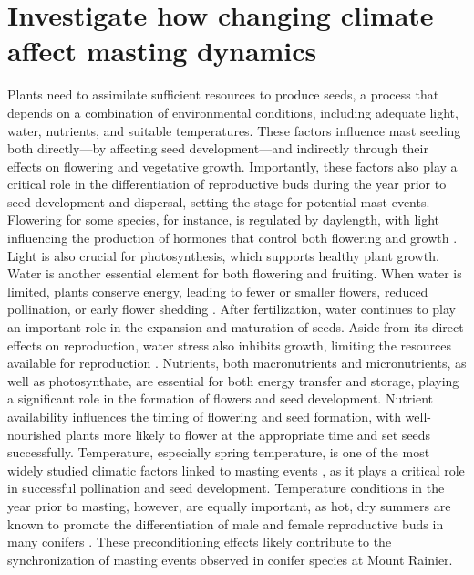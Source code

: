 \documentclass[11pt,letter]{article}
\begin{document}
\section{Investigate how changing climate affect masting dynamics}
Plants need to assimilate sufficient resources to produce seeds, a process that depends on a combination of environmental conditions, including adequate light, water, nutrients, and suitable temperatures. These factors influence mast seeding both directly—by affecting seed development—and indirectly through their effects on flowering and vegetative growth. Importantly, these factors also play a critical role in the differentiation of reproductive buds during the year prior to seed development and dispersal, setting the stage for potential mast events. Flowering for some species, for instance, is regulated by daylength, with light influencing the production of hormones that control both flowering and growth \citep{lau2010plant}. Light is also crucial for photosynthesis, which supports healthy plant growth. Water is another essential element for both flowering and fruiting. When water is limited, plants conserve energy, leading to fewer or smaller flowers, reduced pollination, or early flower shedding \citep{gallagher2017shifts}. After fertilization, water continues to play an important role in the expansion and maturation of seeds. Aside from its direct effects on reproduction, water stress also inhibits growth, limiting the resources available for reproduction \citep{hsiao1973plant, anjum2011morphological}. Nutrients, both macronutrients and micronutrients, as well as photosynthate, are essential for both energy transfer and storage, playing a significant role in the formation of flowers and seed development. Nutrient availability influences the timing of flowering and seed formation, with well-nourished plants more likely to flower at the appropriate time and set seeds successfully. Temperature, especially spring temperature, is one of the most widely studied climatic factors linked to masting events \citep{bajocco2021characterizing, moreira2015effects, schauber2002masting, bogdziewicz2024evolutionary}, as it plays a critical role in successful pollination and seed development. Temperature conditions in the year prior to masting, however, are equally important, as hot, dry summers are known to promote the differentiation of male and female reproductive buds in many conifers \citep{moreira2015effects}. These preconditioning effects likely contribute to the synchronization of masting events observed in conifer species at Mount Rainier.
\end{document}
